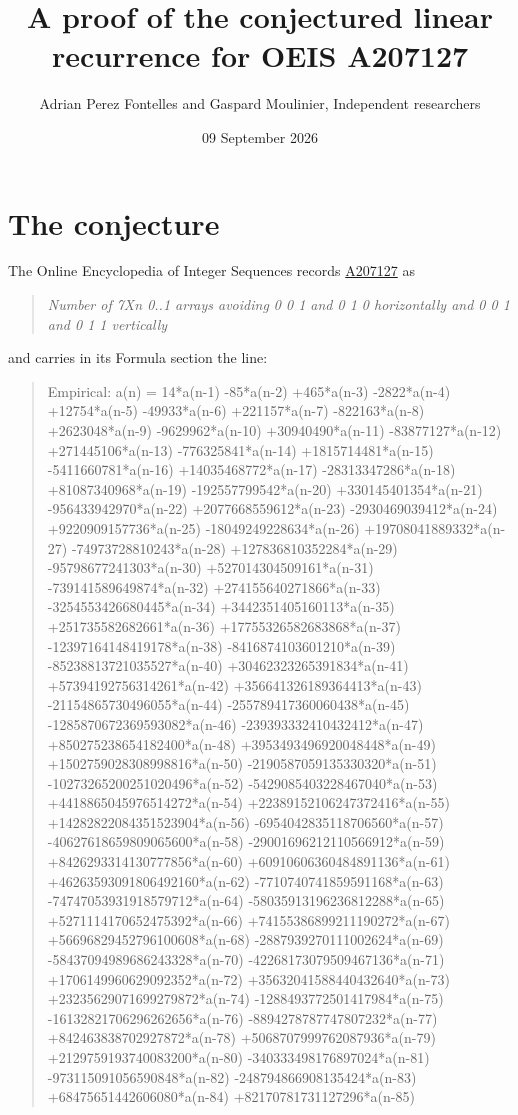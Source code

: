 \documentclass[11pt]{article}
\title{A proof of the conjectured linear recurrence for OEIS A207127}
\author{Adrian Perez Fontelles and Gaspard Moulinier, Independent researchers}
\date{09 September 2026}
\theoremstyle{definition}
\begin{document}
\maketitle
\section{The conjecture}

The Online Encyclopedia of Integer Sequences records \href{https://oeis.org/A207127}{A207127} as

\begin{quote}\itshape Number of 7Xn 0..1 arrays avoiding 0 0 1 and 0 1 0 horizontally and 0 0 1 and 0 1 1 vertically\end{quote}

and carries in its Formula section the line:

\begin{quote}\ttfamily Empirical: a(n) = 14*a(n-1) -85*a(n-2) +465*a(n-3) -2822*a(n-4) +12754*a(n-5) -49933*a(n-6) +221157*a(n-7) -822163*a(n-8) +2623048*a(n-9) -9629962*a(n-10) +30940490*a(n-11) -83877127*a(n-12) +271445106*a(n-13) -776325841*a(n-14) +1815714481*a(n-15) -5411660781*a(n-16) +14035468772*a(n-17) -28313347286*a(n-18) +81087340968*a(n-19) -192557799542*a(n-20) +330145401354*a(n-21) -956433942970*a(n-22) +2077668559612*a(n-23) -2930469039412*a(n-24) +9220909157736*a(n-25) -18049249228634*a(n-26) +19708041889332*a(n-27) -74973728810243*a(n-28) +127836810352284*a(n-29) -95798677241303*a(n-30) +527014304509161*a(n-31) -739141589649874*a(n-32) +274155640271866*a(n-33) -3254553426680445*a(n-34) +3442351405160113*a(n-35) +251735582682661*a(n-36) +17755326582683868*a(n-37) -12397164148419178*a(n-38) -8416874103601210*a(n-39) -85238813721035527*a(n-40) +30462323265391834*a(n-41) +57394192756314261*a(n-42) +356641326189364413*a(n-43) -21154865730496055*a(n-44) -255789417360060438*a(n-45) -1285870672369593082*a(n-46) -239393332410432412*a(n-47) +850275238654182400*a(n-48) +3953493496920048448*a(n-49) +1502759028308998816*a(n-50) -2190587059135330320*a(n-51) -10273265200251020496*a(n-52) -5429085403228467040*a(n-53) +4418865045976514272*a(n-54) +22389152106247372416*a(n-55) +14282822084351523904*a(n-56) -6954042835118706560*a(n-57) -40627618659809065600*a(n-58) -29001696212110566912*a(n-59) +8426293314130777856*a(n-60) +60910606360484891136*a(n-61) +46263593091806492160*a(n-62) -7710740741859591168*a(n-63) -74747053931918579712*a(n-64) -58035913196236812288*a(n-65) +5271114170652475392*a(n-66) +74155386899211190272*a(n-67) +56696829452796100608*a(n-68) -2887939270111002624*a(n-69) -58437094989686243328*a(n-70) -42268173079509467136*a(n-71) +1706149960629092352*a(n-72) +35632041588440432640*a(n-73) +23235629071699279872*a(n-74) -1288493772501417984*a(n-75) -16132821706296262656*a(n-76) -8894278787747807232*a(n-77) +842463838702927872*a(n-78) +5068707999762087936*a(n-79) +2129759193740083200*a(n-80) -340333498176897024*a(n-81) -973115091056590848*a(n-82) -248794866908135424*a(n-83) +68475651442606080*a(n-84) +82170781731127296*a(n-85)\end{quote}
\end{document}
